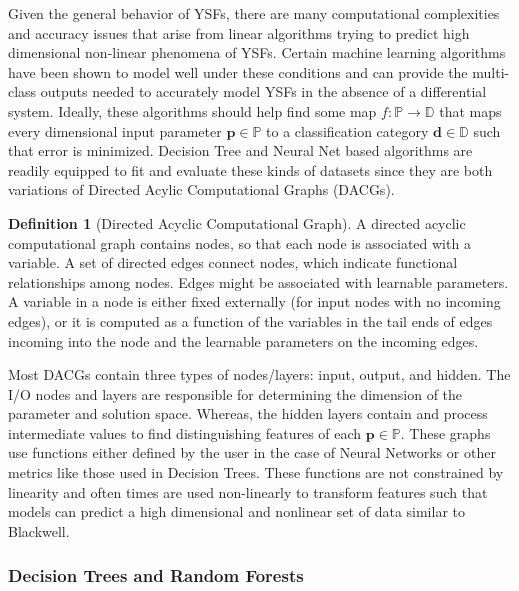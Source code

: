 \documentclass{article}
\theoremstyle{definition}
\newtheorem{definition}{Definition}[section]
\begin{document}
Given the general behavior of YSFs, there are many computational complexities and accuracy issues that arise from linear algorithms trying to predict high dimensional non-linear phenomena of YSFs.  Certain machine learning algorithms have been shown to model well under these conditions and can provide the multi-class outputs needed to accurately model YSFs in the absence of a differential system.  Ideally, these algorithms should help find some map $f: \mathbb{P} \xrightarrow{} \mathbb{D}$ that maps every dimensional input parameter $\boldsymbol{p}\in \mathbb{P}$ to a classification category $\boldsymbol{d}\in \mathbb{D}$ such that error is minimized.  Decision Tree and Neural Net based algorithms are readily equipped to fit and evaluate these kinds of datasets since they are both variations of Directed Acylic Computational Graphs (DACGs).
\begin{definition}[Directed Acyclic Computational Graph]
    A directed acyclic computational graph contains nodes, so that each node is 
    associated with a variable. A set of directed edges connect nodes, which indicate functional relationships among nodes. Edges might be associated with learnable parameters. A variable in a node is either fixed externally (for input nodes with no incoming edges), or it is computed as a function of the variables in the tail ends of edges incoming into the node and the learnable parameters on the incoming edges.
\end{definition}

Most DACGs contain three types of nodes/layers: input, output, and hidden.  The I/O nodes and layers are responsible for determining the dimension of the parameter and solution space.  Whereas, the hidden layers contain and process intermediate values to find distinguishing features of each $\boldsymbol{p}\in \mathbb{P}$.  These graphs use functions either defined by the user in the case of Neural Networks or other metrics like those used in Decision Trees.  These functions are not constrained by linearity and often times are used non-linearly to transform features such that models can predict a high dimensional and nonlinear set of data similar to Blackwell.  





\subsubsection{Decision Trees and Random Forests}
\end{document}
